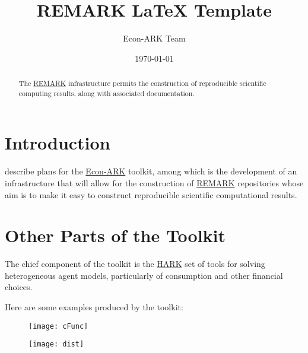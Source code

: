 \documentclass[12pt]{article}
\title{REMARK \LaTeX{} Template}
\author{Econ-ARK Team}
\date{\today}
\begin{document}
\maketitle

\begin{abstract}
The \href{https://github.com/econ-ark/REMARK}{REMARK} infrastructure permits the construction of reproducible scientific computing results, along with associated documentation.
\end{abstract}

\section{Introduction}

\cite{carroll_et_al-proc-scipy-2018} describe plans for the \href{https://econ-ark.org}{Econ-ARK} toolkit, among which is the development of an infrastructure that will allow for the construction of \href{https://econ-ark.org/materials/REMARK}{REMARK} repositories whose aim is to make it easy to construct reproducible scientific computational results.

\section{Other Parts of the Toolkit}

The chief component of the toolkit is the \href{https://github.com/econ-ark/HARK}{HARK} set of tools for solving heterogeneous agent models, particularly of consumption and other financial choices.

Here are some examples produced by the toolkit:

\begin{figure}
\texttt{[image: cFunc]}
\end{figure}
\begin{figure}
\texttt{[image: dist]}
\end{figure}


\end{document}
